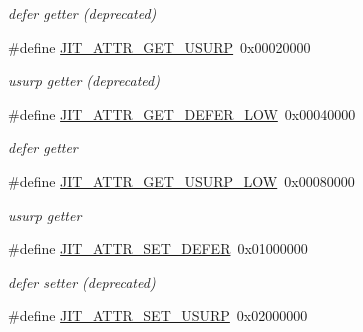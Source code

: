 \begin{DoxyCompactItemize}
\begin{DoxyCompactList}\small\item\em defer getter (deprecated) \item\end{DoxyCompactList}\item 
\hypertarget{group__jitter_ga671a2b2c9ef9f347d5a161b8cb9bcc9e}{
\#define \hyperlink{group__jitter_ga671a2b2c9ef9f347d5a161b8cb9bcc9e}{JIT\_\-ATTR\_\-GET\_\-USURP}~0x00020000}
\label{group__jitter_ga671a2b2c9ef9f347d5a161b8cb9bcc9e}

\begin{DoxyCompactList}\small\item\em usurp getter (deprecated) \item\end{DoxyCompactList}\item 
\hypertarget{group__jitter_ga810447020b75b5173d4c6776cd2653d8}{
\#define \hyperlink{group__jitter_ga810447020b75b5173d4c6776cd2653d8}{JIT\_\-ATTR\_\-GET\_\-DEFER\_\-LOW}~0x00040000}
\label{group__jitter_ga810447020b75b5173d4c6776cd2653d8}

\begin{DoxyCompactList}\small\item\em defer getter \item\end{DoxyCompactList}\item 
\hypertarget{group__jitter_ga07253544f23d315b75f37accf1270a4b}{
\#define \hyperlink{group__jitter_ga07253544f23d315b75f37accf1270a4b}{JIT\_\-ATTR\_\-GET\_\-USURP\_\-LOW}~0x00080000}
\label{group__jitter_ga07253544f23d315b75f37accf1270a4b}

\begin{DoxyCompactList}\small\item\em usurp getter \item\end{DoxyCompactList}\item 
\hypertarget{group__jitter_gafb0470fc7ed5e1bbee265c131ad66488}{
\#define \hyperlink{group__jitter_gafb0470fc7ed5e1bbee265c131ad66488}{JIT\_\-ATTR\_\-SET\_\-DEFER}~0x01000000}
\label{group__jitter_gafb0470fc7ed5e1bbee265c131ad66488}

\begin{DoxyCompactList}\small\item\em defer setter (deprecated) \item\end{DoxyCompactList}\item 
\hypertarget{group__jitter_ga3c97eb0dab6ac2588b8a86d2823d8765}{
\#define \hyperlink{group__jitter_ga3c97eb0dab6ac2588b8a86d2823d8765}{JIT\_\-ATTR\_\-SET\_\-USURP}~0x02000000}
\label{group__jitter_ga3c97eb0dab6ac2588b8a86d2823d8765}


\end{DoxyCompactItemize}
